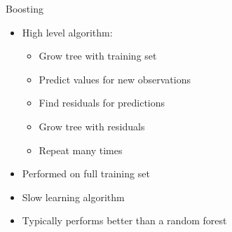 \documentclass{beamer}
\begin{document}
	\begin{frame}{Boosting}
		\begin{itemize}
			\item High level algorithm:
			\begin{itemize}
				\item Grow tree with training set
				\item Predict values for new observations
				\item Find residuals for predictions
				\item Grow tree with residuals
				\item Repeat many times
			\end{itemize}
			\item Performed on full training set
			\item Slow learning algorithm
			\item Typically performs better than a random forest
		\end{itemize}
	\end{frame}
\end{document}
